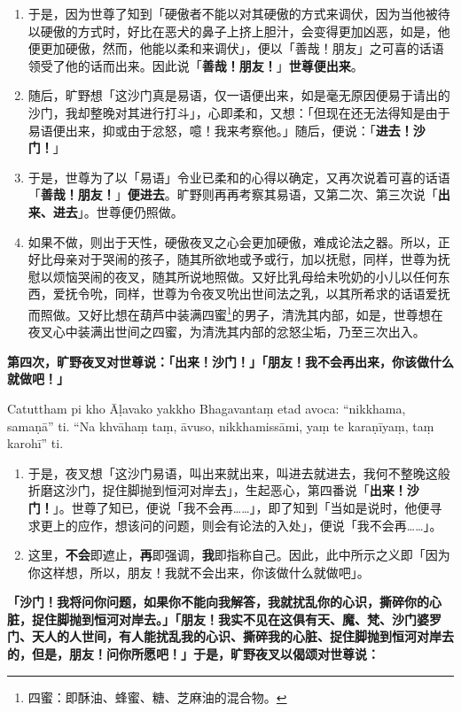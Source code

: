 \begin{enumerate}
\item 于是，因为世尊了知到「硬傲者不能以对其硬傲的方式来调伏，因为当他被待以硬傲的方式时，好比在恶犬的鼻子上挤上胆汁，会变得更加凶恶，如是，他便更加硬傲，然而，他能以柔和来调伏」，便以「善哉！朋友」之可喜的话语领受了他的话而出来。因此说「\textbf{善哉！朋友！}」\textbf{世尊便出来}。
\item 随后，旷野想「这沙门真是易语，仅一语便出来，如是毫无原因便易于请出的沙门，我却整晚对其进行打斗」，心即柔和，又想：「但现在还无法得知是由于易语便出来，抑或由于忿怒，噫！我来考察他。」随后，便说：「\textbf{进去！沙门！}」
\item 于是，世尊为了以「易语」令业已柔和的心得以确定，又再次说着可喜的话语「\textbf{善哉！朋友！}」\textbf{便进去}。旷野则再再考察其易语，又第二次、第三次说「\textbf{出来、进去}」。世尊便仍照做。
\item 如果不做，则出于天性，硬傲夜叉之心会更加硬傲，难成论法之器。所以，正好比母亲对于哭闹的孩子，随其所欲地或予或行，加以抚慰，同样，世尊为抚慰以烦恼哭闹的夜叉，随其所说地照做。又好比乳母给未吮奶的小儿以任何东西，爱抚令吮，同样，世尊为令夜叉吮出世间法之乳，以其所希求的话语爱抚而照做。又好比想在葫芦中装满四蜜\footnote{四蜜：即酥油、蜂蜜、糖、芝麻油的混合物。}的男子，清洗其内部，如是，世尊想在夜叉心中装满出世间之四蜜，为清洗其内部的忿怒尘垢，乃至三次出入。\end{enumerate}

\textbf{第四次，旷野夜叉对世尊说：「出来！沙门！」「朋友！我不会再出来，你该做什么就做吧！」}

Catuttham pi kho Āḷavako yakkho Bhagavantaṃ etad avoca: “nikkhama, samaṇā” ti. “Na khvāhaṃ taṃ, āvuso, nikkhamissāmi, yaṃ te karaṇīyaṃ, taṃ karohī” ti.

\begin{enumerate}\item 于是，夜叉想「这沙门易语，叫出来就出来，叫进去就进去，我何不整晚这般折磨这沙门，捉住脚抛到恒河对岸去」，生起恶心，第四番说「\textbf{出来！沙门！}」。世尊了知已，便说「我不会再……」，即了知到「当如是说时，他便寻求更上的应作，想该问的问题，则会有论法的入处」，便说「我不会再……」。
\item 这里，\textbf{不会}即遮止，\textbf{再}即强调，\textbf{我}即指称自己。因此，此中所示之义即「因为你这样想，所以，朋友！我就不会出来，你该做什么就做吧」。\end{enumerate}

\textbf{「沙门！我将问你问题，如果你不能向我解答，我就扰乱你的心识，撕碎你的心脏，捉住脚抛到恒河对岸去。」「朋友！我实不见在这俱有天、魔、梵、沙门婆罗门、天人的人世间，有人能扰乱我的心识、撕碎我的心脏、捉住脚抛到恒河对岸去的，但是，朋友！问你所愿吧！」于是，旷野夜叉以偈颂对世尊说：}

